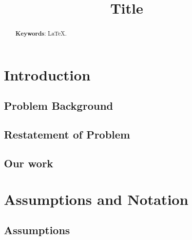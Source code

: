 \documentclass[12pt]{article}  %
\title{Title}  %
\begin{document}
\begin{abstract}




    \vspace{5pt}
    \textbf{Keywords}: \LaTeX.
\end{abstract}

\maketitle  %
\tableofcontents  %






\section{Introduction}
\subsection{Problem Background}
\subsection{Restatement of Problem}

\subsection{Our work}







\section{Assumptions and Notation}
\subsection{Assumptions}
\end{document}
